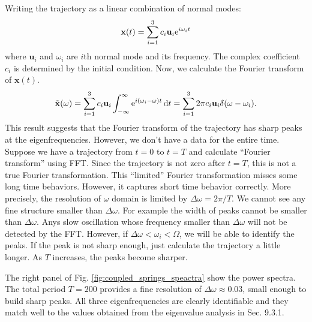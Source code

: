 Writing the trajectory as a linear combination of normal modes:
\begin{equation}
\mathbf{x}(t) = \sum_{i=1}^{3} c_i \mathbf{u}_i \text{e}^{i \omega_i t}
\end{equation}
where $\mathbf{u}_i$ and $\omega_i$ are $i$th normal mode and its frequency.  The complex coefficient $c_i$ is determined by the initial condition.  Now, we calculate the Fourier transform of $\mathbf{x}(t)$.
\begin{equation}
\tilde{\mathbf{x}}(\omega) = \sum_{i=1}^{3} c_i \mathbf{u}_i \int_{-\infty}^{\infty} \text{e}^{i (\omega_i - \omega) t} \dd{t}
= \sum_{i=1}^{3} 2\pi c_i \mathbf{u}_i \delta(\omega-\omega_i).
\end{equation}
This result suggests that the Fourier transform of the trajectory has sharp peaks at the eigenfrequencies. However, we don't have a data for the entire time.  Suppose we have a trajectory from $t=0$ to $t=T$ and calculate ``Fourier transform'' using FFT.  Since the trajectory is not zero after $t=T$, this is not a true Fourier transformation. This ``limited'' Fourier transformation misses some long time behaviors. However, it captures short time behavior correctly.  More precisely, the resolution of $\omega$ domain is limited by $\Delta \omega = 2\pi/T$. We cannot see any fine structure smaller than $\Delta \omega$.  For example the width of peaks cannot be smaller than $\Delta \omega$.  Anys slow oscillation whose frequency smaller than $\Delta \omega$ will not be detected by the FFT.  However, if $\Delta \omega < \omega_i <\Omega$, we will be able to identify the peaks. If the peak is not sharp enough, just calculate the trajectory a little longer. As $T$ increases, the peaks become sharper.

The right panel of Fig. \ref{fig:coupled_springs_speactra} show the power spectra. The total period $T=200$ provides a fine resolution of $\Delta \omega\approx 0.03$, small enough to build sharp peaks.  All three eigenfrequencies are clearly identifiable and they match well to the values obtained from the eigenvalue analysis in Sec. 9.3.1. 

